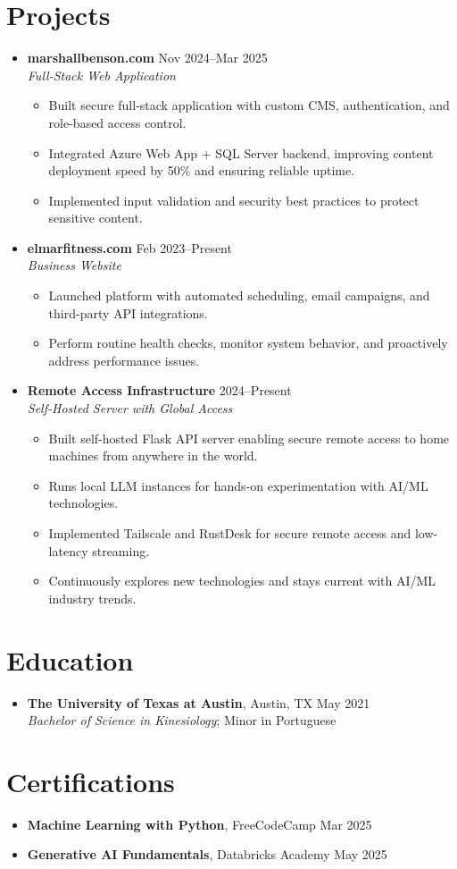 \documentclass[letterpaper,10pt]{article}
\newcommand{\resumeItem}[1]{\item \small{#1}}
\begin{document}
\section*{Projects}
\begin{itemize}
  \item[]
    \textbf{marshallbenson.com} \hfill Nov 2024--Mar 2025 \\
    \textit{Full-Stack Web Application}
  \begin{itemize}
    \resumeItem{Built secure full-stack application with custom CMS, authentication, and role-based access control.}
    \resumeItem{Integrated Azure Web App + SQL Server backend, improving content deployment speed by 50\% and ensuring reliable uptime.}
    \resumeItem{Implemented input validation and security best practices to protect sensitive content.}
  \end{itemize}

  \item[]
    \textbf{elmarfitness.com} \hfill Feb 2023--Present \\
    \textit{Business Website}
  \begin{itemize}
    \resumeItem{Launched platform with automated scheduling, email campaigns, and third-party API integrations.}
    \resumeItem{Perform routine health checks, monitor system behavior, and proactively address performance issues.}
  \end{itemize}

  \item[]
    \textbf{Remote Access Infrastructure} \hfill 2024--Present \\
    \textit{Self-Hosted Server with Global Access}
  \begin{itemize}
    \resumeItem{Built self-hosted Flask API server enabling secure remote access to home machines from anywhere in the world.}
    \resumeItem{Runs local LLM instances for hands-on experimentation with AI/ML technologies.}
    \resumeItem{Implemented Tailscale and RustDesk for secure remote access and low-latency streaming.}
    \resumeItem{Continuously explores new technologies and stays current with AI/ML industry trends.}
  \end{itemize}
\end{itemize}

\section*{Education}
\begin{itemize}
  \resumeItem{\textbf{The University of Texas at Austin}, Austin, TX \hfill May 2021 \\ \textit{Bachelor of Science in Kinesiology}; Minor in Portuguese}
\end{itemize}

\section*{Certifications}
\begin{itemize}
  \resumeItem{\textbf{Machine Learning with Python}, FreeCodeCamp \hfill Mar 2025}
  \resumeItem{\textbf{Generative AI Fundamentals}, Databricks Academy \hfill May 2025}
\end{itemize}
\end{document}

